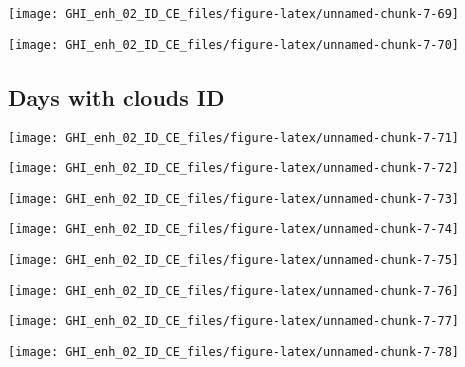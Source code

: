 \documentclass[
  10pt,
  a4paper,oneside]{article}
\begin{document}
\begin{center}\texttt{[image: GHI\_enh\_02\_ID\_CE\_files/figure-latex/unnamed-chunk-7-69]} \end{center}

\begin{center}\texttt{[image: GHI\_enh\_02\_ID\_CE\_files/figure-latex/unnamed-chunk-7-70]} \end{center}

\FloatBarrier

\hypertarget{days-with-clouds-id}{%
\subsection{Days with clouds ID}\label{days-with-clouds-id}}

\begin{center}\texttt{[image: GHI\_enh\_02\_ID\_CE\_files/figure-latex/unnamed-chunk-7-71]} \end{center}

\begin{center}\texttt{[image: GHI\_enh\_02\_ID\_CE\_files/figure-latex/unnamed-chunk-7-72]} \end{center}

\begin{center}\texttt{[image: GHI\_enh\_02\_ID\_CE\_files/figure-latex/unnamed-chunk-7-73]} \end{center}

\begin{center}\texttt{[image: GHI\_enh\_02\_ID\_CE\_files/figure-latex/unnamed-chunk-7-74]} \end{center}

\begin{center}\texttt{[image: GHI\_enh\_02\_ID\_CE\_files/figure-latex/unnamed-chunk-7-75]} \end{center}

\begin{center}\texttt{[image: GHI\_enh\_02\_ID\_CE\_files/figure-latex/unnamed-chunk-7-76]} \end{center}

\begin{center}\texttt{[image: GHI\_enh\_02\_ID\_CE\_files/figure-latex/unnamed-chunk-7-77]} \end{center}

\begin{center}\texttt{[image: GHI\_enh\_02\_ID\_CE\_files/figure-latex/unnamed-chunk-7-78]} \end{center}
\end{document}
